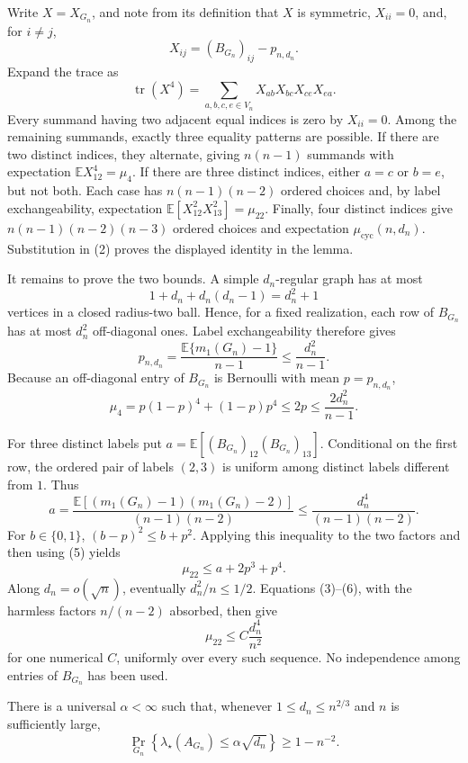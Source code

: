Write \(X=X_{G_n}\), and note from its definition that \(X\) is symmetric,
\(X_{ii}=0\), and, for \(i\ne j\),
\[
X_{ij}=(B_{G_n})_{ij}-p_{n,d_n}.
\tag{1}
\]
Expand the trace as
\[
\operatorname{tr}(X^4)=
\sum_{a,b,c,e\in V_n}X_{ab}X_{bc}X_{ce}X_{ea}.
\tag{2}
\]
Every summand having two adjacent equal indices is zero by \(X_{ii}=0\).
Among the remaining summands, exactly three equality patterns are possible.
If there are two distinct indices, they alternate, giving
\(n(n-1)\) summands with expectation
\(\mathbb E X_{12}^4=\mu_4\).  If there are three distinct indices, either
\(a=c\) or \(b=e\), but not both.  Each case has
\(n(n-1)(n-2)\) ordered choices and, by label exchangeability, expectation
\(\mathbb E[X_{12}^2X_{13}^2]=\mu_{22}\).  Finally, four distinct indices
give \(n(n-1)(n-2)(n-3)\) ordered choices and expectation
\(\mu_{\mathrm{cyc}}(n,d_n)\).  Substitution in (2) proves the displayed
identity in the lemma.

It remains to prove the two bounds.  A simple \(d_n\)-regular graph has at
most
\[
1+d_n+d_n(d_n-1)=d_n^2+1
\]
vertices in a closed radius-two ball.  Hence, for a fixed realization,
each row of \(B_{G_n}\) has at most \(d_n^2\) off-diagonal ones.  Label
exchangeability therefore gives
\[
p_{n,d_n}
=\frac{\mathbb E\{m_1(G_n)-1\}}{n-1}
\le \frac{d_n^2}{n-1}.
\tag{3}
\]
Because an off-diagonal entry of \(B_{G_n}\) is Bernoulli with mean
\(p=p_{n,d_n}\),
\[
\mu_4=p(1-p)^4+(1-p)p^4\le 2p
\le\frac{2d_n^2}{n-1}.
\tag{4}
\]

For three distinct labels put
\(a=\mathbb E[(B_{G_n})_{12}(B_{G_n})_{13}]\).  Conditional on the first
row, the ordered pair of labels \((2,3)\) is uniform among distinct labels
different from \(1\).  Thus
\[
a=\frac{\mathbb E[(m_1(G_n)-1)(m_1(G_n)-2)]}
{(n-1)(n-2)}
\le\frac{d_n^4}{(n-1)(n-2)}.
\tag{5}
\]
For \(b\in\{0,1\}\), \((b-p)^2\le b+p^2\).  Applying this inequality to
the two factors and then using (5) yields
\[
\mu_{22}
\le a+2p^3+p^4.
\tag{6}
\]
Along \(d_n=o(\sqrt n)\), eventually \(d_n^2/n\le1/2\).  Equations
(3)--(6), with the harmless factors \(n/(n-2)\) absorbed, then give
\[
\mu_{22}\le C\frac{d_n^4}{n^2}
\]
for one numerical \(C\), uniformly over every such sequence.  No
independence among entries of \(B_{G_n}\) has been used.

There is a universal \(\alpha<\infty\) such that, whenever
\(1\le d_n\le n^{2/3}\) and \(n\) is sufficiently large,
\[
\Pr_{G_n}\!\left\{\lambda_{\star}(A_{G_n})
\le\alpha\sqrt{d_n}\right\}\ge1-n^{-2}.
\]

